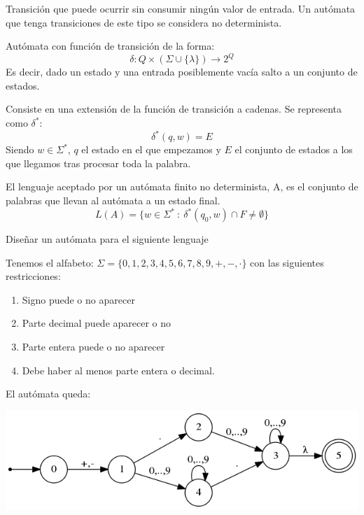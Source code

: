 \documentclass{apuntes}
\begin{document}
\begin{defn}
Transición que puede ocurrir sin consumir ningún valor de entrada. Un autómata que tenga transiciones de este tipo se considera no determinista.
\end{defn}

\begin{defn}
Autómata con función de transición de la forma:
\[\delta: Q\times (\Sigma \cup \lbrace \lambda \rbrace) \rightarrow 2^Q\]
Es decir, dado un estado y una entrada posiblemente vacía salto a un conjunto de estados.
\end{defn}

\begin{defn}
Consiste en una extensión de la función de transición a cadenas. Se representa como $\delta ^*$:
\[\delta^*(q, w) = E\]
Siendo $w\in \Sigma ^*$, $q$ el estado en el que empezamos y $E$ el conjunto de estados a los que llegamos tras procesar toda la palabra.
\end{defn}

\newpage

\begin{defn}
El lenguaje aceptado por un autómata finito no determinista, A, es el conjunto de palabras que llevan al autómata a un estado final.
\[L(A) = \lbrace w \in \Sigma^* \ : \ \delta^*(q_0, w)\cap F \neq \emptyset \rbrace\]
\end{defn}

\begin{example}
Diseñar un autómata para el siguiente lenguaje

Tenemos el alfabeto: $\Sigma = \lbrace 0,1,2,3,4,5,6,7,8,9,+,-,\cdot \rbrace$ con las siguientes restricciones:
\begin{enumerate}
\item Signo puede o no aparecer
\item Parte decimal puede aparecer o no
\item Parte entera puede o no aparecer
\item Debe haber al menos parte entera o decimal.
\end{enumerate}

El autómata queda:
\begin{center}
\includegraphics[scale=0.75]{automata4.png}
\end{center}
\end{example}
\end{document}
